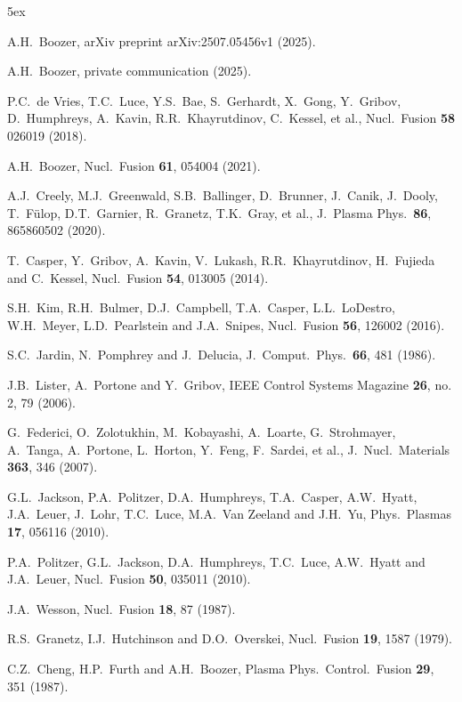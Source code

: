 \documentclass{iopjournal}
\begin{document}
\begin{thebibliography}{99}\baselineskip 5ex

   A.H.~Boozer, arXiv preprint arXiv:2507.05456v1 (2025). 

  A.H.~Boozer, private communication (2025).

 P.C.~de Vries, T.C.~Luce, Y.S.~Bae, S.~Gerhardt, X.~Gong, Y.~Gribov, 
D.~Humphreys, A.~Kavin, R.R.~Khayrutdinov, C.~Kessel, et al., Nucl.\ Fusion {\bf 58} 026019 (2018).

 A.H.~Boozer, Nucl.\ Fusion {\bf 61}, 054004 (2021). 

 A.J.~Creely, M.J.~Greenwald, S.B.~Ballinger, D.~Brunner, J.~Canik, J.~Dooly, 
T.~F\"{u}lop, D.T.~Garnier, R.~Granetz, T.K.~Gray, et al.,  J.\ Plasma Phys.\ {\bf 86}, 865860502 (2020).

 T.~Casper, Y.~Gribov, A.~Kavin, V.~Lukash, R.R.~Khayrutdinov, H.~Fujieda and C.~Kessel, Nucl.\ Fusion {\bf 54}, 013005 (2014).

 S.H.~Kim, R.H.~Bulmer, D.J.~Campbell, T.A.~Casper, L.L.~LoDestro, W.H.~Meyer, L.D.~Pearlstein and J.A.~Snipes,
Nucl.\ Fusion {\bf 56}, 126002 (2016).

 S.C.~Jardin, N.~Pomphrey and J.~Delucia, J.\ Comput.\ Phys.\ {\bf 66}, 481 (1986).

 J.B.~Lister, A.~Portone and Y.~Gribov, IEEE Control Systems Magazine {\bf 26}, no. 2, 79 (2006).

 G.~Federici, O.~Zolotukhin, M.~Kobayashi, A.~Loarte, G.~Strohmayer, A.~Tanga, A.~Portone, L.~Horton,
Y.~Feng, F.~Sardei, et al., J.\ Nucl.\ Materials {\bf 363}, 346 (2007). 

 G.L.~Jackson, P.A.~Politzer, D.A.~Humphreys, T.A.~Casper, A.W.~Hyatt, J.A.~Leuer, J.~Lohr,
T.C.~Luce, M.A.~Van Zeeland and J.H.~Yu, Phys.\ Plasmas {\bf 17}, 056116 (2010).

 P.A.~Politzer, G.L.~Jackson, D.A.~Humphreys, T.C.~Luce, A.W.~Hyatt and J.A.~Leuer, Nucl.\ Fusion {\bf 50}, 035011 (2010).

 J.A.~Wesson, Nucl.\ Fusion {\bf 18}, 87 (1987).

 R.S.~Granetz, I.J.~Hutchinson and D.O.~Overskei, Nucl.\ Fusion {\bf 19}, 1587 (1979).

 C.Z.~Cheng, H.P.~Furth and A.H.~Boozer, Plasma Phys.\ Control.\ Fusion {\bf 29}, 351 (1987).


\end{thebibliography}
\end{document}
